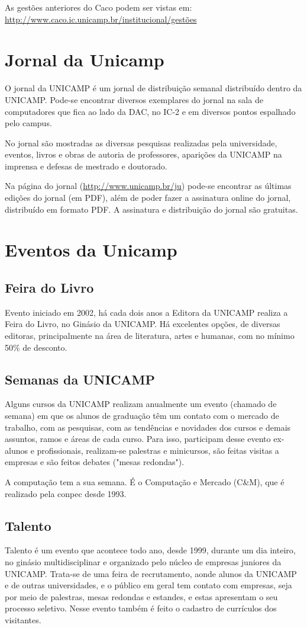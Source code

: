 \documentclass[a4paper,10pt]{article}
\begin{document}
As gestões anteriores do Caco podem ser vistas em:
\url{http://www.caco.ic.unicamp.br/institucional/gestões}

\section{Jornal da Unicamp}
O jornal da UNICAMP é um jornal de distribuição semanal distribuído dentro da
UNICAMP. Pode-se encontrar diversos exemplares do jornal na sala de computadores
que fica ao lado da DAC, no IC-2 e em diversos pontos espalhado pelo campus.

No jornal são mostradas as diversas pesquisas realizadas pela universidade,
eventos, livros e obras de autoria de professores, aparições da UNICAMP na
imprensa e defesas de mestrado e doutorado.

Na página do jornal (\url{http://www.unicamp.br/ju}) pode-se encontrar as
últimas edições do jornal (em PDF), além de poder fazer a assinatura online do
jornal, distribuído em formato PDF. A assinatura e distribuição do jornal são
gratuitas.

\section{Eventos da Unicamp}
\subsection{Feira do Livro}
Evento iniciado em 2002, há cada dois anos a Editora da UNICAMP realiza a Feira
do Livro, no Ginásio da UNICAMP. Há excelentes opções, de diversas editoras,
principalmente na área de literatura, artes e humanas, com no mínimo 50\% de
desconto.

\subsection{Semanas da UNICAMP}
Alguns cursos da UNICAMP realizam anualmente um evento (chamado de semana) em
que os alunos de graduação têm um contato com o mercado de trabalho, com as
pesquisas, com as tendências e novidades dos cursos e demais assuntos, ramos
e áreas de cada curso. Para isso, participam desse evento ex-alunos
e profissionais, realizam-se palestras e minicursos, são feitas visitas
a empresas e são feitos debates ("mesas redondas").

A computação tem a sua semana. É o Computação e Mercado (C\&M), que é realizado
pela conpec desde 1993.

\subsection{Talento}
Talento é um evento que acontece todo ano, desde 1999, durante um dia inteiro,
no ginásio multidisciplinar e organizado pelo núcleo de empresas juniores da
UNICAMP. Trata-se de uma feira de recrutamento, aonde alunos da UNICAMP e de
outras universidades, e o público em geral tem contato com empresas, seja por
meio de palestras, mesas redondas e estandes, e estas apresentam o seu processo
seletivo. Nesse evento também é feito o cadastro de currículos dos visitantes.
\end{document}
